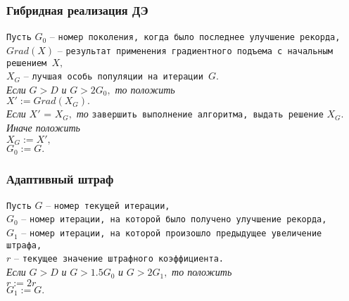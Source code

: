 \begin{frame}
    \frametitle{Гибридная реализация ДЭ}

    \begin{flushleft}
    \small
    \verb"Пусть"
    $G_0$ -- \verb"номер поколения, когда было последнее улучшение рекорда,"\\
    $Grad(X)$ -- \verb"результат применения градиентного подъема с начальным решением "$X,$\\
    $X_G$ -- \verb"лучшая особь популяции на итерации "$G.$\\
    $\mbox{ }$\\

    \textit{Если} $G > D$ \textit{и} $G > 2 G_0,$ \textit{то положить} \\
    \leftskip=12pt
        $X' := Grad(X_G).$\\
        \textit{Если} $X'$ = $X_G,$ \textit{то} \verb"завершить выполнение алгоритма, выдать решение" $X_G.$\\
        \textit{Иначе положить} \\
        \leftskip=24pt
            $X_G := X',$\\
            $G_0 := G.$\\
            \leftskip=12pt
    \end{flushleft}
\end{frame}

\begin{frame}
    \frametitle{Адаптивный штраф}

    \begin{flushleft}
    \small
    \verb"Пусть"
    $G$ -- \verb"номер текущей итерации," \\
    $G_0$ -- \verb"номер итерации, на которой было получено улучшение рекорда,"\\
    $G_1$ -- \verb"номер итерации, на которой произошло предыдущее увеличение штрафа,"\\
    $r$ -- \verb"текущее значение штрафного коэффициента."\\
    $\mbox{ }$\\

    \textit{Если} $G > D$ \textit{и} $G > 1.5 G_0$ \textit{и} $G > 2 G_1,$  \textit{то положить} \\
    \leftskip=12pt
        $r := 2r$\\
        $G_1 := G.$\\
        \leftskip=0pt
    \end{flushleft}
\end{frame}

